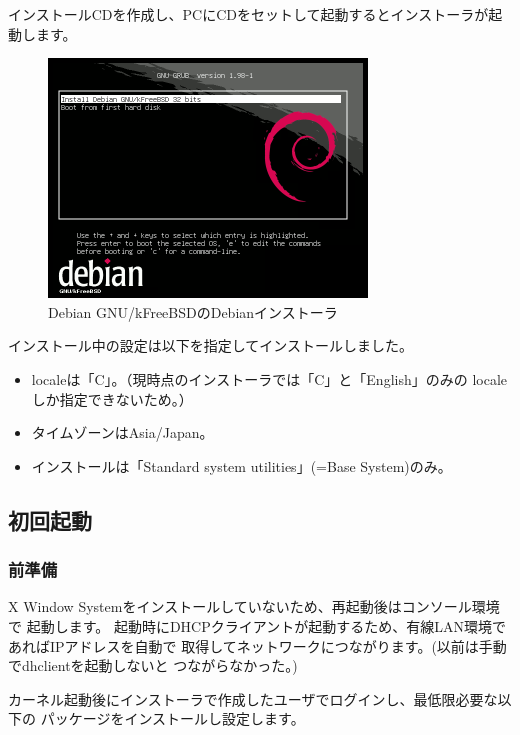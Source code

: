 \documentclass[mingoth,a4paper]{jsarticle}
\begin{document}
インストールCDを作成し、PCにCDをセットして起動するとインストーラが起動します。

\begin{figure}[H]
\begin{center}
\includegraphics{image201008/kfreebsd-installer.png}
\caption{Debian GNU/kFreeBSDのDebianインストーラ}\label{debinstaller}
\end{center}
\end{figure}

インストール中の設定は以下を指定してインストールしました。

\begin{itemize}
 \item localeは「C」。（現時点のインストーラでは「C」と「English」のみの
localeしか指定できないため。）
 \item タイムゾーンはAsia/Japan。
 \item インストールは「Standard system utilities」(=Base System)のみ。
\end{itemize}

\subsection{初回起動}
\subsubsection{前準備}
X Window Systemをインストールしていないため、再起動後はコンソール環境で
起動します。
起動時にDHCPクライアントが起動するため、有線LAN環境であればIPアドレスを自動で
取得してネットワークにつながります。(以前は手動でdhclientを起動しないと
つながらなかった。)

カーネル起動後にインストーラで作成したユーザでログインし、最低限必要な以下の
パッケージをインストールし設定します。

\end{document}
